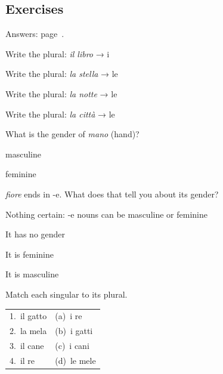 \documentclass[11pt,a4paper,twoside,openright]{book}
\newcommand{\blank}{\underline{\hspace{2.6cm}}}
\begin{document}
\subsection*{Exercises}\label{les:noun-gender-number:exercises}
{\color{muted}\small Answers: page~\pageref{ans:noun-gender-number}.}

\begin{exercises}
\item\label{ex:noun-gender-number-1}\relax Write the plural: \textit{il libro} → i \blank{}
\item\label{ex:noun-gender-number-2}\relax Write the plural: \textit{la stella} → le \blank{}
\item\label{ex:noun-gender-number-3}\relax Write the plural: \textit{la notte} → le \blank{}
\item\label{ex:noun-gender-number-4}\relax Write the plural: \textit{la città} → le \blank{}
\item\label{ex:noun-gender-number-5}\relax What is the gender of \textit{mano} (hand)?\par\nopagebreak\begin{options}
\item\relax masculine
\item\relax feminine
\end{options}
\item\label{ex:noun-gender-number-6}\relax \textit{fiore} ends in -e. What does that tell you about its gender?\par\nopagebreak\begin{options}
\item\relax Nothing certain: -e nouns can be masculine or feminine
\item\relax It has no gender
\item\relax It is feminine
\item\relax It is masculine
\end{options}
\item\label{ex:noun-gender-number-7}\relax Match each singular to its plural.\par\smallskip\begin{tabularx}{\linewidth}{@{}L L@{}}
1.\ il gatto & (a)\ i re \\
2.\ la mela & (b)\ i gatti \\
3.\ il cane & (c)\ i cani \\
4.\ il re & (d)\ le mele \\
\end{tabularx}
\end{exercises}
\end{document}
